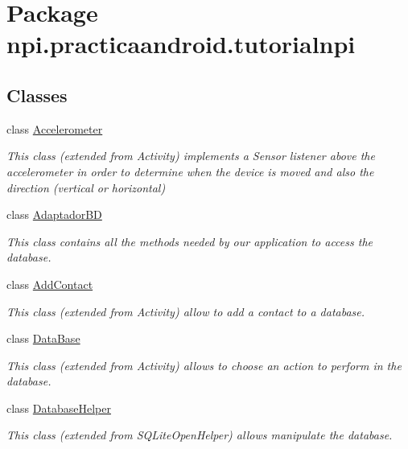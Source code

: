 \hypertarget{namespacenpi_1_1practicaandroid_1_1tutorialnpi}{\section{Package npi.\-practicaandroid.\-tutorialnpi}
\label{namespacenpi_1_1practicaandroid_1_1tutorialnpi}
}
\subsection*{Classes}
\begin{DoxyCompactItemize}
\item 
class \hyperlink{classnpi_1_1practicaandroid_1_1tutorialnpi_1_1_accelerometer}{Accelerometer}
\begin{DoxyCompactList}\small\item\em This class (extended from Activity) implements a Sensor listener above the accelerometer in order to determine when the device is moved and also the direction (vertical or horizontal) \end{DoxyCompactList}\item 
class \hyperlink{classnpi_1_1practicaandroid_1_1tutorialnpi_1_1_adaptador_b_d}{Adaptador\-B\-D}
\begin{DoxyCompactList}\small\item\em This class contains all the methods needed by our application to access the database. \end{DoxyCompactList}\item 
class \hyperlink{classnpi_1_1practicaandroid_1_1tutorialnpi_1_1_add_contact}{Add\-Contact}
\begin{DoxyCompactList}\small\item\em This class (extended from Activity) allow to add a contact to a database. \end{DoxyCompactList}\item 
class \hyperlink{classnpi_1_1practicaandroid_1_1tutorialnpi_1_1_data_base}{Data\-Base}
\begin{DoxyCompactList}\small\item\em This class (extended from Activity) allows to choose an action to perform in the database. \end{DoxyCompactList}\item 
class \hyperlink{classnpi_1_1practicaandroid_1_1tutorialnpi_1_1_database_helper}{Database\-Helper}
\begin{DoxyCompactList}\small\item\em This class (extended from S\-Q\-Lite\-Open\-Helper) allows manipulate the database. \end{DoxyCompactList}\item 

\end{DoxyCompactItemize}
